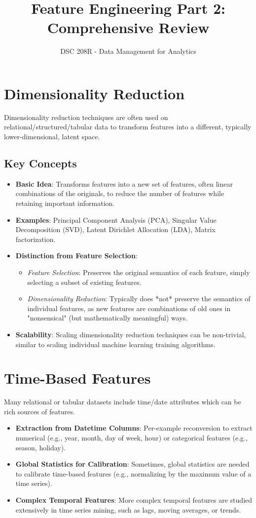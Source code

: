 \documentclass{article}
\title{Feature Engineering Part 2: Comprehensive Review}
\author{DSC 208R - Data Management for Analytics}
\date{}
\begin{document}
\maketitle

\section*{Dimensionality Reduction}
Dimensionality reduction techniques are often used on relational/structured/tabular data to transform features into a different, typically lower-dimensional, latent space.

\subsection*{Key Concepts}
\begin{itemize}
    \item \textbf{Basic Idea}: Transforms features into a new set of features, often linear combinations of the originals, to reduce the number of features while retaining important information.
    \item \textbf{Examples}: Principal Component Analysis (PCA), Singular Value Decomposition (SVD), Latent Dirichlet Allocation (LDA), Matrix factorization.
    \item \textbf{Distinction from Feature Selection}:
    \begin{itemize}
        \item \textit{Feature Selection}: Preserves the original semantics of each feature, simply selecting a subset of existing features.
        \item \textit{Dimensionality Reduction}: Typically does *not* preserve the semantics of individual features, as new features are combinations of old ones in "nonsensical" (but mathematically meaningful) ways.
    \end{itemize}
    \item \textbf{Scalability}: Scaling dimensionality reduction techniques can be non-trivial, similar to scaling individual machine learning training algorithms.
\end{itemize}

\section*{Time-Based Features}
Many relational or tabular datasets include time/date attributes which can be rich sources of features.

\begin{itemize}
    \item \textbf{Extraction from Datetime Columns}: Per-example reconversion to extract numerical (e.g., year, month, day of week, hour) or categorical features (e.g., season, holiday).
    \item \textbf{Global Statistics for Calibration}: Sometimes, global statistics are needed to calibrate time-based features (e.g., normalizing by the maximum value of a time series).
    \item \textbf{Complex Temporal Features}: More complex temporal features are studied extensively in time series mining, such as lags, moving averages, or trends.
\end{itemize}
\end{document}

